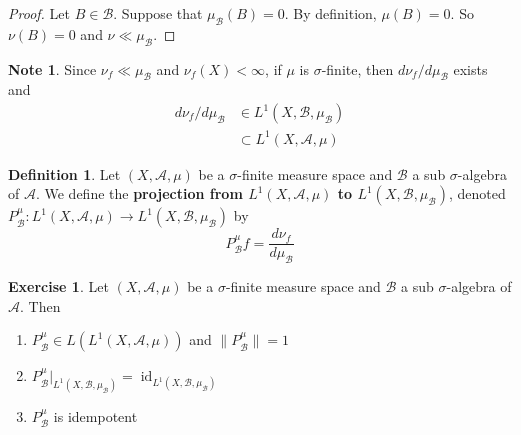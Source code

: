 \documentclass{book}
\theoremstyle{definition}
\newtheorem{defn}[definition]{Definition}
\newtheorem{note}[definition]{Note}
\newtheorem{ex}[definition]{Exercise}
\newcommand{\sig}{\sigma}
\newcommand{\MA}{\mathcal{A}}
\newcommand{\MB}{\mathcal{B}}
\DeclareMathOperator{\id}{id}
\DeclareMathOperator*{\0}{\mbf{0}}
\DeclareMathOperator*{\1}{\mbf{1}}
\begin{document}
	\begin{proof}
		Let $B \in \MB$. Suppose that $\mu_{\MB}(B) = 0$. By definition, $\mu(B) = 0$. So $\nu(B) = 0$ and $\nu \ll \mu_{\MB}$.
	\end{proof}
	
	\begin{note}
		Since $\nu_f \ll \mu_{\MB}$ and $\nu_f(X) < \infty$, if $\mu$ is $\sig$-finite, then $d \nu_{f} / d \mu_{\MB}$ exists and 
		\begin{align*}
			d \nu_{f} / d \mu_{\MB} 
			& \in L^1(X, \MB, \mu_{\MB}) \\
			& \subset L^1(X, \MA, \mu)
		\end{align*}
	\end{note}
	
	\begin{defn}
		Let $(X, \MA, \mu)$ be a $\sig$-finite measure space and $\MB$ a sub $\sig$-algebra of $\MA$. We define the \textbf{projection from $L^1(X, \MA, \mu)$ to $L^1(X, \MB, \mu_{\MB})$}, denoted $P^{\mu}_{\MB}:L^1(X, \MA, \mu) \rightarrow L^1(X, \MB, \mu_{\MB})$ by 
		$$P^{\mu}_{\MB}f = \frac{d \nu_f}{d \mu_{\MB}}$$ 
	\end{defn}
	
	\begin{ex}
		Let $(X, \MA, \mu)$ be a $\sig$-finite measure space and $\MB$ a sub $\sig$-algebra of $\MA$. Then 
		\begin{enumerate}
			\item $P^{\mu}_{\MB} \in L(L^1(X, \MA, \mu))$ and $\|P^{\mu}_{\MB}\| = 1$
			\item $P^{\mu}_{\MB}|_{L^1(X, \MB, \mu_{\MB})} = \id_{L^1(X, \MB, \mu_{\MB})}$ 
			\item $P^{\mu}_{\MB}$ is idempotent
		\end{enumerate}
	\end{ex}
	
\end{document}
